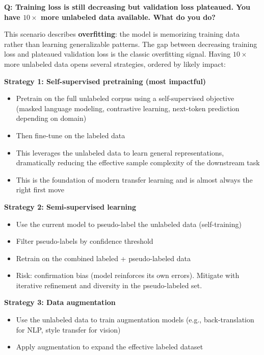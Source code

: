\begin{interviewq}
\textbf{Q: Training loss is still decreasing but validation loss plateaued. You have $10\times$ more unlabeled data available. What do you do?}

 \quad {} \quad \badgefreq{\freqmed}

\stronganswer
This scenario describes \textbf{overfitting}: the model is memorizing training data rather than learning generalizable patterns. The gap between decreasing training loss and plateaued validation loss is the classic overfitting signal. Having $10\times$ more unlabeled data opens several strategies, ordered by likely impact:

\textbf{Strategy 1: Self-supervised pretraining (most impactful)}
\begin{itemize}
    \item Pretrain on the full unlabeled corpus using a self-supervised objective (masked language modeling, contrastive learning, next-token prediction depending on domain)
    \item Then fine-tune on the labeled data
    \item This leverages the unlabeled data to learn general representations, dramatically reducing the effective sample complexity of the downstream task
    \item This is the foundation of modern transfer learning and is almost always the right first move
\end{itemize}

\textbf{Strategy 2: Semi-supervised learning}
\begin{itemize}
    \item Use the current model to pseudo-label the unlabeled data (self-training)
    \item Filter pseudo-labels by confidence threshold
    \item Retrain on the combined labeled + pseudo-labeled data
    \item Risk: confirmation bias (model reinforces its own errors). Mitigate with iterative refinement and diversity in the pseudo-labeled set.
\end{itemize}

\textbf{Strategy 3: Data augmentation}
\begin{itemize}
    \item Use the unlabeled data to train augmentation models (e.g., back-translation for NLP, style transfer for vision)
    \item Apply augmentation to expand the effective labeled dataset
\end{itemize}


\end{interviewq}
